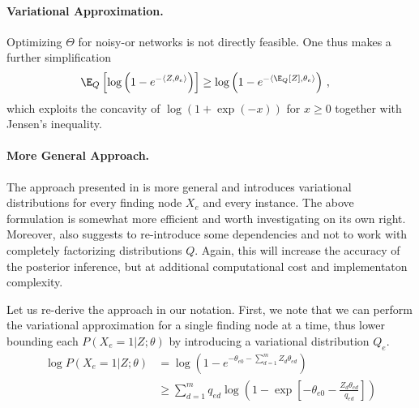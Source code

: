 
\paragraph{Variational Approximation.}

Optimizing $\Theta$ for noisy-or networks is not directly feasible. One thus makes a further simplification
\begin{align}
\E_Q \left[ \log \left( 1- e ^{- \langle Z, \theta_e \rangle} \right) \right] & \ge \log \left(1- e^{- \langle \E_Q[Z], \theta_{e}\rangle} \right)\,, 
\end{align} 
which exploits the concavity of $\log(1+\exp(-x))$ for $x \ge 0$ together with Jensen's inequality.  



\paragraph{More General Approach.} The approach presented in \cite{jaakkola1999variational} is more general and introduces variational distributions for every finding node $X_e$ and every instance. The above formulation is somewhat more efficient and worth investigating on its own right. Moreover, \cite{jaakkola1999variational} also suggests to re-introduce some dependencies and not to work with completely factorizing distributions $Q$. Again, this will increase the accuracy of the posterior inference, but at additional computational cost and implementaton complexity. 

Let us re-derive the \cite{jaakkola1999variational} approach in our notation. First, we note that we can perform the variational approximation for a single finding node at a time, thus lower bounding each $P(X_e=1|Z; \theta)$ by introducing a variational distribution $Q_e$. 
\begin{align}
\log P(X_e=1| Z; \theta) & = \log \left ( 1- e^{-\theta_{e0} - \sum_{d=1}^m Z_d \theta_{ed}} \right) \\
& \ge \sum_{d=1}^m q_{ed} \log \left ( 1-\exp\left[ -\theta_{e0} - \frac{Z_d \theta_{ed}}{q_{ed}} \right] \right) 
\end{align}




